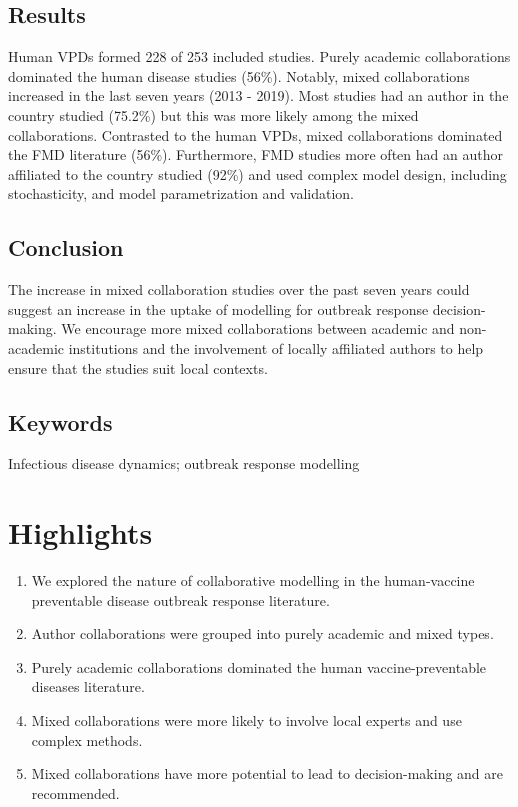 \documentclass[10pt,letterpaper]{article}
\begin{document}
\subsection*{Results}
Human VPDs formed 228 of 253 included studies. Purely academic collaborations dominated the human disease studies (56\%). Notably, mixed collaborations increased in the last seven years (2013 - 2019). Most studies had an author in the country studied (75.2\%) but this was more likely among the mixed collaborations. Contrasted to the human VPDs, mixed collaborations dominated the FMD literature (56\%). Furthermore, FMD studies more often had an author affiliated to the country studied (92\%) and used complex model design, including stochasticity, and model parametrization and validation. 
\subsection*{Conclusion}
The increase in mixed collaboration studies over the past seven years could suggest an increase in the uptake of modelling for outbreak response decision-making. We encourage more mixed collaborations between academic and non-academic institutions and the involvement of locally affiliated authors to help ensure that the studies suit local contexts.

\subsection*{Keywords}
Infectious disease dynamics; outbreak response modelling

\section*{Highlights}
\begin{enumerate}
	\item We explored the nature of collaborative modelling in the human-vaccine preventable disease outbreak response literature.
	\item Author collaborations were grouped into purely academic and mixed types.
	\item Purely academic collaborations dominated the human vaccine-preventable diseases literature.
	\item Mixed collaborations were more likely to involve local experts and use complex methods.
	\item Mixed collaborations have more potential to lead to decision-making and are recommended.
\end{enumerate}
\end{document}

